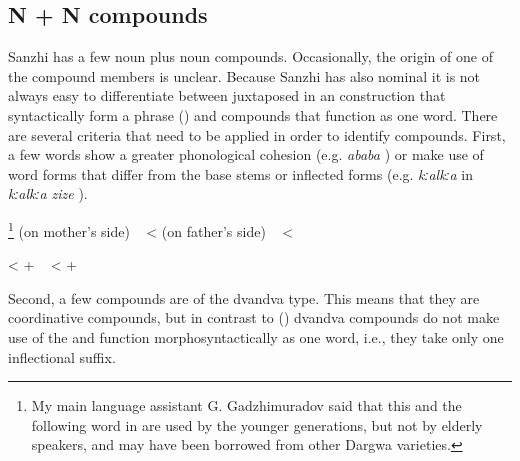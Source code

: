 
\subsection{N + N compounds}
\label{ssec:Nounnoun compounds}

Sanzhi has a few noun plus noun compounds. Occasionally, the origin of one of the compound members is unclear. Because Sanzhi has also nominal  it is not always easy to differentiate between juxtaposed  in an  construction that syntactically form a phrase () and compounds that function as one word. There are several criteria that need to be applied in order to identify compounds. First, a few words show a greater phonological cohesion (e.g. \textit{ababa} ) or make use of word forms that differ from the base stems or inflected forms (e.g. \textit{kːalkːa} in \textit{kːalkːa zize} ).
%
\begin{exe}
	\ex	\label{ex:kːalkːa zizeraspberry}
	\begin{xlist}
		\TabPositions{10em,12em}
		\ex	{}\footnote{My main language assistant G. Gadzhimuradov said that this and the following word in  are used by the younger generations, but not by elderly speakers, and may have been borrowed from other Dargwa varieties.}  (on mother's side)
		\sn	~\hspace*{1em}					\tab	<	\tab	{} 
				\ex	\label{ex:ATTABAphon}   (on father's side)
		\sn	~\hspace*{1em}	\tab	<	\tab	{} 
		
		
		\ex	{} 			\tab	<	\tab	{}  +  
		\ex	{} 
		\sn	~\hspace*{1em}					\tab	<	\tab	{}  +  
	\end{xlist}
\end{exe}

Second, a few compounds are of the dvandva type. This means that they are coordinative compounds, but in contrast to   () dvandva compounds do not make use of the  and function morphosyntactically as one word, i.e., they take only one inflectional suffix.

